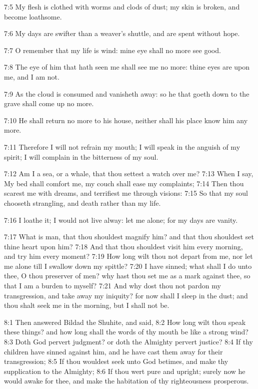 7:5 My flesh is clothed with worms and clods of dust; my skin is broken, and become loathsome.

7:6 My days are swifter than a weaver's shuttle, and are spent without hope.

7:7 O remember that my life is wind: mine eye shall no more see good.

7:8 The eye of him that hath seen me shall see me no more: thine eyes are upon me, and I am not.

7:9 As the cloud is consumed and vanisheth away: so he that goeth down to the grave shall come up no more.

7:10 He shall return no more to his house, neither shall his place know him any more.

7:11 Therefore I will not refrain my mouth; I will speak in the anguish of my spirit; I will complain in the bitterness of my soul.

7:12 Am I a sea, or a whale, that thou settest a watch over me?  7:13 When I say, My bed shall comfort me, my couch shall ease my complaints; 7:14 Then thou scarest me with dreams, and terrifiest me through visions: 7:15 So that my soul chooseth strangling, and death rather than my life.

7:16 I loathe it; I would not live alway: let me alone; for my days are vanity.

7:17 What is man, that thou shouldest magnify him? and that thou shouldest set thine heart upon him?  7:18 And that thou shouldest visit him every morning, and try him every moment?  7:19 How long wilt thou not depart from me, nor let me alone till I swallow down my spittle?  7:20 I have sinned; what shall I do unto thee, O thou preserver of men?  why hast thou set me as a mark against thee, so that I am a burden to myself?  7:21 And why dost thou not pardon my transgression, and take away my iniquity? for now shall I sleep in the dust; and thou shalt seek me in the morning, but I shall not be.

8:1 Then answered Bildad the Shuhite, and said, 8:2 How long wilt thou speak these things? and how long shall the words of thy mouth be like a strong wind?  8:3 Doth God pervert judgment? or doth the Almighty pervert justice?  8:4 If thy children have sinned against him, and he have cast them away for their transgression; 8:5 If thou wouldest seek unto God betimes, and make thy supplication to the Almighty; 8:6 If thou wert pure and upright; surely now he would awake for thee, and make the habitation of thy righteousness prosperous.

